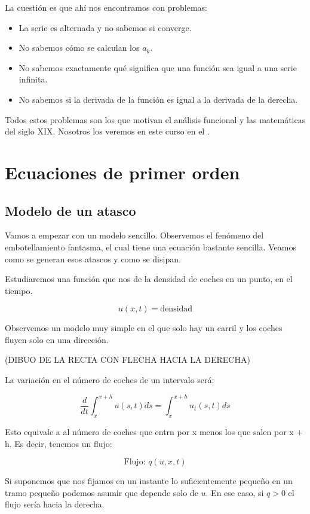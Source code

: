 \documentclass[palatino]{apuntes}
\begin{document}
La cuestión es que ahí nos encontramos con problemas:
\begin{itemize}
	\item La serie es alternada y no sabemos si converge.
	\item No sabemos cómo se calculan los $a_k$.
	\item No sabemos exactamente qué significa que una función sea igual a una serie infinita.
	\item No sabemos si la derivada de la función es igual a la derivada de la derecha.
\end{itemize}

Todos estos problemas son los que motivan el análisis funcional y las matemáticas del siglo XIX. Nosotros los veremos en este curso en el .

\chapter{Ecuaciones de primer orden}

\section{Modelo de un atasco}

Vamos a empezar con un modelo sencillo. Observemos el fenómeno del embotellamiento fantasma, el cual tiene una ecuación bastante sencilla. Veamos como se generan esos atascos y como se disipan.

Estudiaremos una función que nos de la densidad de coches en un punto, en el tiempo.

$$u(x,t) = \text{densidad}$$

Observemos un modelo muy simple en el que solo hay un carril y los coches fluyen solo en una dirección.

(DIBUO DE LA RECTA CON FLECHA HACIA LA DERECHA)

La variación en el número de coches de un intervalo será:

$$ \frac{d}{dt} \int^{x+h}_{x} u(s,t) ds = \int^{x+h}_{x} u_t(s,t) ds $$

Esto equivale a al número de coches que entrn por x menos los que salen por x + h. Es decir, tenemos un flujo:

$$\text{Flujo: } q(u, x, t)$$

Si suponemos que nos fijamos en un instante lo suficientemente pequeño en un tramo pequeño podemos asumir que depende solo de $u$. En ese caso, si $q > 0$ el flujo sería hacia la derecha.
\end{document}
